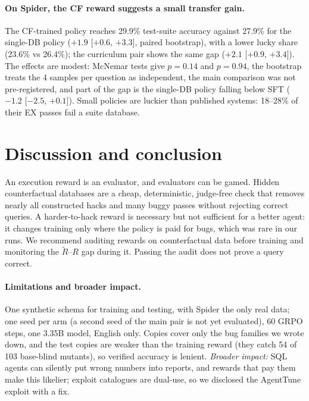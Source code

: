 \documentclass{article}
\begin{document}
\paragraph{On Spider, the CF reward suggests a small transfer gain.}
The CF-trained policy reaches 29.9\% test-suite accuracy against 27.9\% for the single-DB policy ($+1.9$ [$+0.6$, $+3.3$], paired bootstrap), with a lower lucky share (23.6\% vs 26.4\%); the curriculum pair shows the same gap ($+2.1$ [$+0.9$, $+3.4$]). The effects are modest: McNemar tests give $p = 0.14$ and $p = 0.94$, the bootstrap treats the 4 samples per question as independent, the main comparison was not pre-registered, and part of the gap is the single-DB policy falling below SFT ($-1.2$ [$-2.5$, $+0.1$]). Small policies are luckier than published systems: 18--28\% of their EX passes fail a suite database.

\section{Discussion and conclusion}
\label{sec:discussion}

An execution reward is an evaluator, and evaluators can be gamed. Hidden counterfactual databases are a cheap, deterministic, judge-free check that removes nearly all constructed hacks and many buggy passes without rejecting correct queries. A harder-to-hack reward is necessary but not sufficient for a better agent: it changes training only where the policy is paid for bugs, which was rare in our runs. We recommend auditing rewards on counterfactual data before training and monitoring the $\tilde R$--$R$ gap during it. Passing the audit does not prove a query correct.

\paragraph{Limitations and broader impact.}
One synthetic schema for training and testing, with Spider the only real data; one seed per arm (a second seed of the main pair is not yet evaluated), 60 GRPO steps, one 3.35B model, English only. Copies cover only the bug families we wrote down, and the test copies are weaker than the training reward (they catch 54 of 103 base-blind mutants), so verified accuracy is lenient. \emph{Broader impact:} SQL agents can silently put wrong numbers into reports, and rewards that pay them make this likelier; exploit catalogues are dual-use, so we disclosed the AgentTune exploit with a fix.
\end{document}
